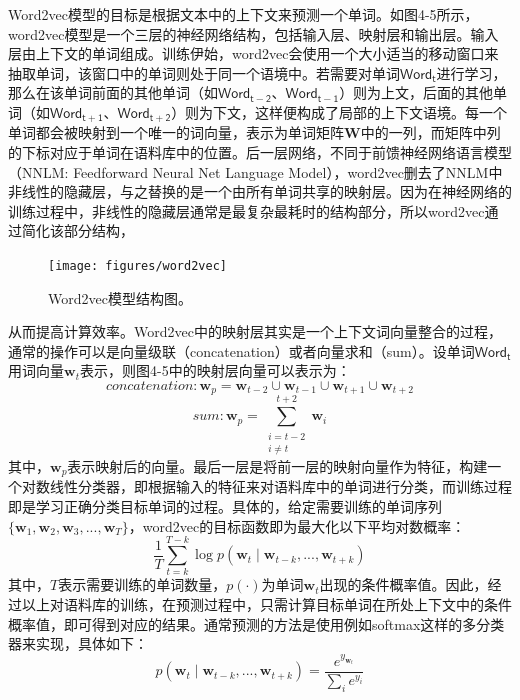 Word2vec模型的目标是根据文本中的上下文来预测一个单词。如图4-5所示，word2vec模型是一个三层的神经网络结构，包括输入层、映射层和输出层。输入层由上下文的单词组成。训练伊始，word2vec会使用一个大小适当的移动窗口来抽取单词，该窗口中的单词则处于同一个语境中。若需要对单词$\mathsf{Word_t}$进行学习，那么在该单词前面的其他单词（如$\mathsf{Word_{t-2}}$、$\mathsf{Word_{t-1}}$）则为上文，后面的其他单词（如$\mathsf{Word_{t+1}}$、$\mathsf{Word_{t+2}}$）则为下文，这样便构成了局部的上下文语境。每一个单词都会被映射到一个唯一的词向量，表示为单词矩阵$\mathbf{W}$中的一列，而矩阵中列的下标对应于单词在语料库中的位置。后一层网络，不同于前馈神经网络语言模型（NNLM: Feedforward Neural Net Language Model）\cite{bengio2003neural}，word2vec删去了NNLM中非线性的隐藏层，与之替换的是一个由所有单词共享的映射层。因为在神经网络的训练过程中，非线性的隐藏层通常是最复杂最耗时的结构部分，所以word2vec通过简化该部分结构，
\begin{figure}
	\centering
	\texttt{[image: figures/word2vec]}
	\caption{Word2vec模型结构图。}
\end{figure}
从而提高计算效率。Word2vec中的映射层其实是一个上下文词向量整合的过程，通常的操作可以是向量级联（concatenation）或者向量求和（sum）。设单词$\mathsf{Word_t}$用词向量$\mathbf{w}_t$表示，则图4-5中的映射层向量可以表示为：
\begin{equation}
concatenation: \mathbf{w}_p = \mathbf{w}_{t-2} \cup \mathbf{w}_{t-1} \cup \mathbf{w}_{t+1} \cup \mathbf{w}_{t+2}
\end{equation}
\begin{equation}
sum: \mathbf{w}_p = \sum_{\substack{i=t-2 \\ i \neq t}}^{t+2} \mathbf{w}_i
\end{equation}
其中，$\mathbf{w}_p$表示映射后的向量。最后一层是将前一层的映射向量作为特征，构建一个对数线性分类器，即根据输入的特征来对语料库中的单词进行分类，而训练过程即是学习正确分类目标单词的过程。具体的，给定需要训练的单词序列$\{\mathbf{w}_1, \mathbf{w}_2, \mathbf{w}_3, ..., \mathbf{w}_T\}$，word2vec的目标函数即为最大化以下平均对数概率：
\begin{equation}
\frac{1}{T} \sum_{t=k}^{T-k} \log p(\mathbf{w}_t \mid \mathbf{w}_{t-k}, ..., \mathbf{w}_{t+k})
\end{equation}
其中，$T$表示需要训练的单词数量，$p(\cdot)$为单词$\mathbf{w}_t$出现的条件概率值。因此，经过以上对语料库的训练，在预测过程中，只需计算目标单词在所处上下文中的条件概率值，即可得到对应的结果。通常预测的方法是使用例如softmax\cite{christopher2006pattern}这样的多分类器来实现，具体如下：
\begin{equation}
p(\mathbf{w}_t \mid \mathbf{w}_{t-k}, ..., \mathbf{w}_{t+k}) = \frac{e^{y_{\mathbf{w}_t}}}{\sum_i e^{y_i}}
\end{equation}
